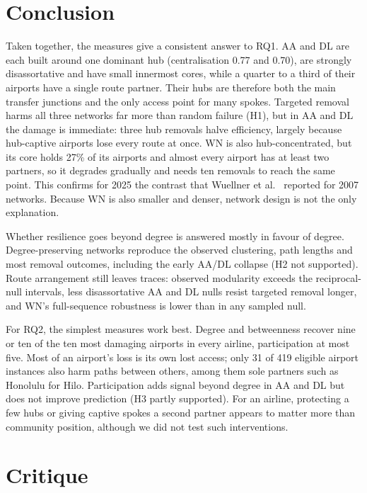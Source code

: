\documentclass[12pt, a4paper]{article}
\begin{document}
\section{Conclusion}
\label{conclusion}

Taken together, the measures give a consistent answer to RQ1. AA and DL are each built around one dominant hub (centralisation 0.77 and 0.70), are strongly disassortative and have small innermost cores, while a quarter to a third of their airports have a single route partner. Their hubs are therefore both the main transfer junctions and the only access point for many spokes. Targeted removal harms all three networks far more than random failure (H1), but in AA and DL the damage is immediate: three hub removals halve efficiency, largely because hub-captive airports lose every route at once. WN is also hub-concentrated, but its core holds 27\% of its airports and almost every airport has at least two partners, so it degrades gradually and needs ten removals to reach the same point. This confirms for 2025 the contrast that Wuellner et al.\ \cite{wuellner2010} reported for 2007 networks. Because WN is also smaller and denser, network design is not the only explanation.

Whether resilience goes beyond degree is answered mostly in favour of degree. Degree-preserving networks reproduce the observed clustering, path lengths and most removal outcomes, including the early AA/DL collapse (H2 not supported). Route arrangement still leaves traces: observed modularity exceeds the reciprocal-null intervals, less disassortative AA and DL nulls resist targeted removal longer, and WN's full-sequence robustness is lower than in any sampled null.

For RQ2, the simplest measures work best. Degree and betweenness recover nine or ten of the ten most damaging airports in every airline, participation at most five. Most of an airport's loss is its own lost access; only 31 of 419 eligible airport instances also harm paths between others, among them sole partners such as Honolulu for Hilo. Participation adds signal beyond degree in AA and DL but does not improve prediction (H3 partly supported). For an airline, protecting a few hubs or giving captive spokes a second partner appears to matter more than community position, although we did not test such interventions.

\section{Critique}
\label{critique}
\end{document}
